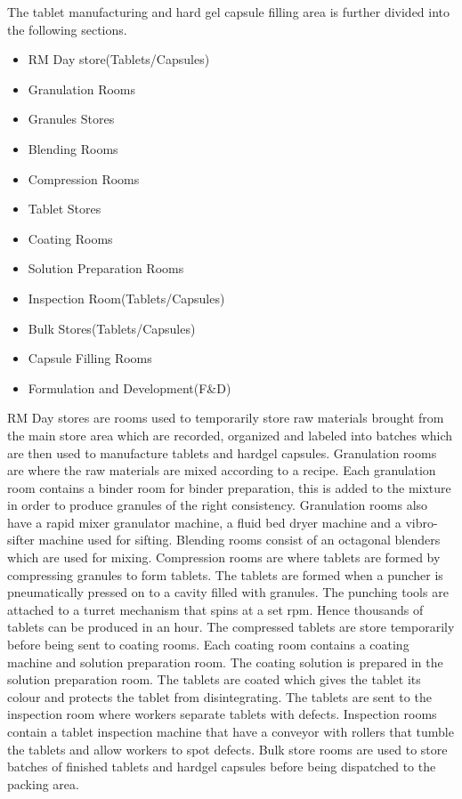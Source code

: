 \documentclass[a4paper,12pt]{article}
\begin{document}
			The tablet manufacturing and hard gel capsule filling area is further divided into the following sections.
			
			\begin{itemize}
				\item RM Day store(Tablets/Capsules)
				\item Granulation Rooms
				\item Granules Stores
				\item Blending Rooms
				\item Compression Rooms
				\item Tablet Stores
				\item Coating Rooms
				\item Solution Preparation Rooms
				\item Inspection Room(Tablets/Capsules)
				\item Bulk Stores(Tablets/Capsules)
				\item Capsule Filling Rooms
				\item Formulation and Development(F{\&}D) 
			\end{itemize}
			
			RM Day stores are rooms used to temporarily store raw materials brought from the main store area which are recorded, organized and labeled into batches which are then used to manufacture tablets and hardgel capsules. Granulation rooms are where the raw materials are mixed according to a recipe. 
			Each granulation room contains a binder room for binder preparation, this  is added to the mixture in order to produce granules of the right consistency. Granulation rooms also have a rapid mixer granulator machine, a fluid bed dryer machine and a vibro-sifter machine used for sifting.
			Blending rooms consist of an octagonal blenders which are used for mixing.
			Compression rooms are where tablets are formed by compressing granules to form tablets.
			The tablets are formed when a puncher is pneumatically pressed on to a cavity filled with granules.
			The punching tools are attached to a turret mechanism that spins at a set rpm. Hence thousands of tablets can be produced in an hour.			  
			The compressed tablets are store temporarily before being sent to coating rooms.
			Each coating room contains a coating machine and solution preparation room. The coating solution is prepared in the solution preparation room. The tablets are coated which gives the tablet its colour and protects the tablet from disintegrating.
			The tablets are sent to the inspection room where workers separate tablets with defects. Inspection rooms contain a tablet inspection machine that have a conveyor with rollers that tumble the tablets and allow workers to spot defects.
			Bulk store rooms are used to store batches of finished tablets and hardgel capsules before being dispatched to the packing area.
		
\end{document}
